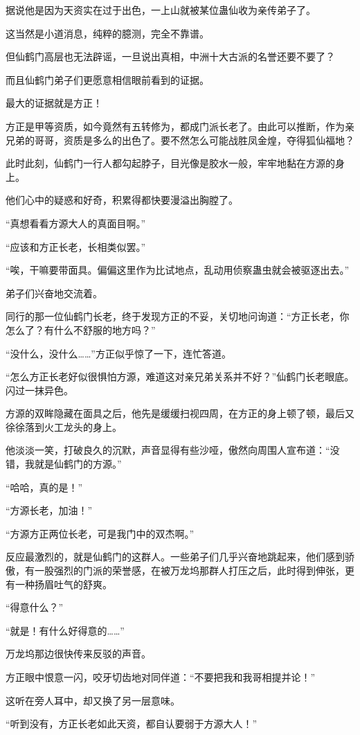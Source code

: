 \begin{this_body}
据说他是因为天资实在过于出色，一上山就被某位蛊仙收为亲传弟子了。

这当然是小道消息，纯粹的臆测，完全不靠谱。

但仙鹤门高层也无法辟谣，一旦说出真相，中洲十大古派的名誉还要不要了？

而且仙鹤门弟子们更愿意相信眼前看到的证据。

最大的证据就是方正！

方正是甲等资质，如今竟然有五转修为，都成门派长老了。由此可以推断，作为亲兄弟的哥哥，资质是多么的出色了。要不然怎么可能战胜凤金煌，夺得狐仙福地？

此时此刻，仙鹤门一行人都勾起脖子，目光像是胶水一般，牢牢地黏在方源的身上。

他们心中的疑惑和好奇，积累得都快要漫溢出胸膛了。

“真想看看方源大人的真面目啊。”

“应该和方正长老，长相类似罢。”

“唉，干嘛要带面具。偏偏这里作为比试地点，乱动用侦察蛊虫就会被驱逐出去。”

弟子们兴奋地交流着。

同行的那一位仙鹤门长老，终于发现方正的不妥，关切地问询道：“方正长老，你怎么了？有什么不舒服的地方吗？”

“没什么，没什么……”方正似乎惊了一下，连忙答道。

“怎么方正长老好似很惧怕方源，难道这对亲兄弟关系并不好？”仙鹤门长老眼底。闪过一抹异色。

方源的双眸隐藏在面具之后，他先是缓缓扫视四周，在方正的身上顿了顿，最后又徐徐落到火工龙头的身上。

他淡淡一笑，打破良久的沉默，声音显得有些沙哑，傲然向周围人宣布道：“没错，我就是仙鹤门的方源。”

“哈哈，真的是！”

“方源长老，加油！”

“方源方正两位长老，可是我门中的双杰啊。”

反应最激烈的，就是仙鹤门的这群人。一些弟子们几乎兴奋地跳起来，他们感到骄傲，有一股强烈的门派的荣誉感，在被万龙坞那群人打压之后，此时得到伸张，更有一种扬眉吐气的舒爽。

“得意什么？”

“就是！有什么好得意的……”

万龙坞那边很快传来反驳的声音。

方正眼中恨意一闪，咬牙切齿地对同伴道：“不要把我和我哥相提并论！”

这听在旁人耳中，却又换了另一层意味。

“听到没有，方正长老如此天资，都自认要弱于方源大人！”


\end{this_body}
